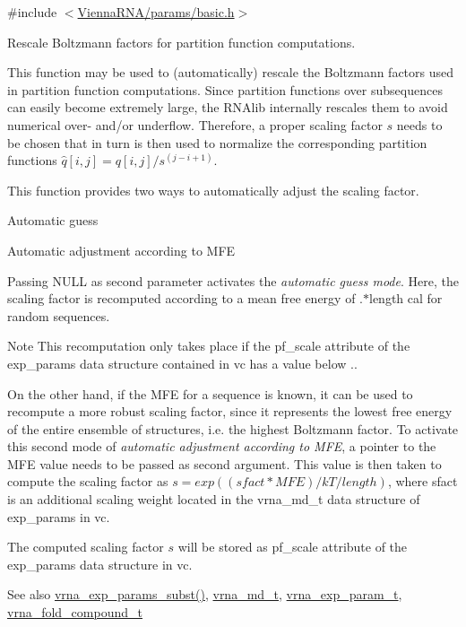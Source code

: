 {\ttfamily \#include $<$\mbox{\hyperlink{params_2basic_8h}{Vienna\+R\+N\+A/params/basic.\+h}}$>$}



Rescale Boltzmann factors for partition function computations. 

This function may be used to (automatically) rescale the Boltzmann factors used in partition function computations. Since partition functions over subsequences can easily become extremely large, the R\+N\+Alib internally rescales them to avoid numerical over-\/ and/or underflow. Therefore, a proper scaling factor $s$ needs to be chosen that in turn is then used to normalize the corresponding partition functions $\hat{q}[i,j] = q[i,j] / s^{(j-i+1)}$.

This function provides two ways to automatically adjust the scaling factor.
\begin{DoxyEnumerate}
\item Automatic guess
\item Automatic adjustment according to M\+FE
\end{DoxyEnumerate}

Passing {\ttfamily N\+U\+LL} as second parameter activates the {\itshape automatic guess mode}. Here, the scaling factor is recomputed according to a mean free energy of {.$\ast$length} cal for random sequences. \begin{DoxyNote}{Note}
This recomputation only takes place if the {\ttfamily pf\+\_\+scale} attribute of the {\ttfamily exp\+\_\+params} data structure contained in {\ttfamily vc} has a value below {.}.
\end{DoxyNote}
On the other hand, if the M\+FE for a sequence is known, it can be used to recompute a more robust scaling factor, since it represents the lowest free energy of the entire ensemble of structures, i.\+e. the highest Boltzmann factor. To activate this second mode of {\itshape automatic adjustment according to M\+FE}, a pointer to the M\+FE value needs to be passed as second argument. This value is then taken to compute the scaling factor as $ s = exp((sfact * MFE) / kT / length )$, where sfact is an additional scaling weight located in the vrna\+\_\+md\+\_\+t data structure of {\ttfamily exp\+\_\+params} in {\ttfamily vc}.

The computed scaling factor $s$ will be stored as {\ttfamily pf\+\_\+scale} attribute of the {\ttfamily exp\+\_\+params} data structure in {\ttfamily vc}.

\begin{DoxySeeAlso}{See also}
\mbox{\hyperlink{group__energy__parameters_ga8e7ac4fab3b0cc03afbc134eaafb3525}{vrna\+\_\+exp\+\_\+params\+\_\+subst()}}, \mbox{\hyperlink{group__model__details_ga1f8a10e12a0a1915f2a4eff0b28ea17c}{vrna\+\_\+md\+\_\+t}}, \mbox{\hyperlink{group__energy__parameters_ga01d8b92fe734df8d79a6169482c7d8d8}{vrna\+\_\+exp\+\_\+param\+\_\+t}}, \mbox{\hyperlink{group__fold__compound_ga1b0cef17fd40466cef5968eaeeff6166}{vrna\+\_\+fold\+\_\+compound\+\_\+t}}
\end{DoxySeeAlso}

